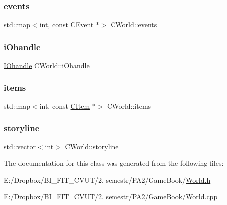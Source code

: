 \mbox{\label{class_c_world_a21950e7420b123b79421457060ebaf60}} 
\subsubsection{\texorpdfstring{events}{events}}
{\footnotesize\ttfamily std\+::map$<$int, const \mbox{\hyperlink{class_c_event}{C\+Event}} $\ast$$>$ C\+World\+::events\hspace{0.3cm}{\ttfamily [protected]}}

\mbox{\label{class_c_world_aececaddab106e7d36d438f17b9ec1ba9}} 
\subsubsection{\texorpdfstring{i\+Ohandle}{iOhandle}}
{\footnotesize\ttfamily \mbox{\hyperlink{class_i_ohandle}{I\+Ohandle}} C\+World\+::i\+Ohandle\hspace{0.3cm}{\ttfamily [protected]}}

\mbox{\label{class_c_world_aef07829b9e53bf45fcf88e368ce1c471}} 
\subsubsection{\texorpdfstring{items}{items}}
{\footnotesize\ttfamily std\+::map$<$int, const \mbox{\hyperlink{class_c_item}{C\+Item}} $\ast$$>$ C\+World\+::items\hspace{0.3cm}{\ttfamily [protected]}}

\mbox{\label{class_c_world_a57cb7b4ee9c9f8070eba90cfbd0717ed}} 
\subsubsection{\texorpdfstring{storyline}{storyline}}
{\footnotesize\ttfamily std\+::vector$<$int$>$ C\+World\+::storyline\hspace{0.3cm}{\ttfamily [protected]}}



The documentation for this class was generated from the following files\+:\begin{DoxyCompactItemize}
\item 
E\+:/\+Dropbox/\+B\+I\+\_\+\+F\+I\+T\+\_\+\+C\+V\+U\+T/2. semestr/\+P\+A2/\+Game\+Book/\mbox{\hyperlink{_world_8h}{World.\+h}}\item 
E\+:/\+Dropbox/\+B\+I\+\_\+\+F\+I\+T\+\_\+\+C\+V\+U\+T/2. semestr/\+P\+A2/\+Game\+Book/\mbox{\hyperlink{_world_8cpp}{World.\+cpp}}\end{DoxyCompactItemize}
